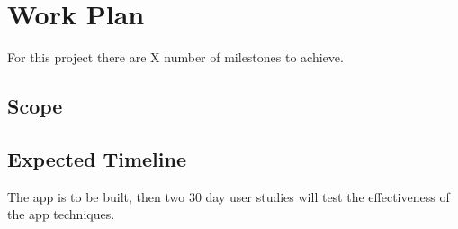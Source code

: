 
\newpage
\section{Work Plan}

For this project there are X number of milestones to achieve.


\subsection*{Scope}

\subsection*{Expected Timeline}

The app is to be built, then two 30 day user studies will test the effectiveness of the app techniques.






